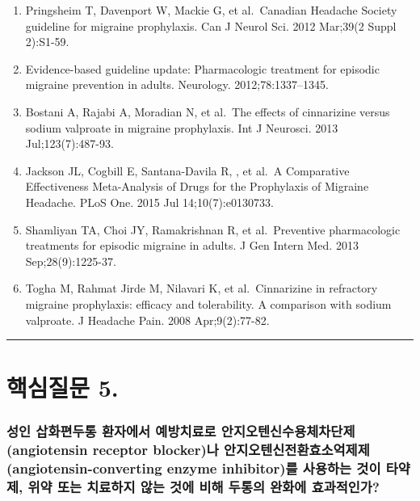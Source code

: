\documentclass[]{book}
\begin{document}
\begin{enumerate}
\def\labelenumi{\arabic{enumi}.}
\item
  Pringsheim T, Davenport W, Mackie G, et al.~Canadian Headache Society guideline for migraine prophylaxis. Can J Neurol Sci. 2012 Mar;39(2 Suppl 2):S1-59.
\item
  Evidence-based guideline update: Pharmacologic treatment for episodic migraine prevention in adults. Neurology. 2012;78:1337--1345.
\item
  Bostani A, Rajabi A, Moradian N, et al.~The effects of cinnarizine versus sodium valproate in migraine prophylaxis. Int J Neurosci. 2013 Jul;123(7):487-93.
\item
  Jackson JL, Cogbill E, Santana-Davila R, , et al.~A Comparative Effectiveness Meta-Analysis of Drugs for the Prophylaxis of Migraine Headache. PLoS One. 2015 Jul 14;10(7):e0130733.
\item
  Shamliyan TA, Choi JY, Ramakrishnan R, et al.~Preventive pharmacologic treatments for episodic migraine in adults. J Gen Intern Med. 2013 Sep;28(9):1225-37.
\item
  Togha M, Rahmat Jirde M, Nilavari K, et al.~Cinnarizine in refractory migraine prophylaxis: efficacy and tolerability. A comparison with sodium valproate. J Headache Pain. 2008 Apr;9(2):77-82.
\end{enumerate}

\begin{center}\rule{0.5\linewidth}{\linethickness}\end{center}

\hypertarget{section-16}{%
\section{핵심질문 5.}\label{section-16}}

\hypertarget{angiotensin-receptor-blocker-angiotensin-converting-enzyme-inhibitor------------}{%
\subsubsection*{성인 삽화편두통 환자에서 예방치료로 안지오텐신수용체차단제(angiotensin receptor blocker)나 안지오텐신전환효소억제제(angiotensin-converting enzyme inhibitor)를 사용하는 것이 타약제, 위약 또는 치료하지 않는 것에 비해 두통의 완화에 효과적인가?}\label{angiotensin-receptor-blocker-angiotensin-converting-enzyme-inhibitor------------}}
\end{document}
